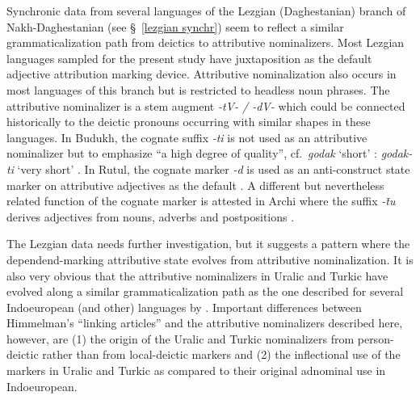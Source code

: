 {Synchronic data from several languages of the Lezgian (Daghestanian) branch of Nakh-Daghestanian (see \S~\ref{lezgian synchr}) seem to reflect a similar grammaticalization path from deictics to attributive nominalizers. Most Lezgian languages sampled for the present study have juxtaposition as the default adjective attribution marking device. Attributive nominalization also occurs in most languages of this branch but is restricted to headless noun phrases. The attributive nominalizer is a stem augment \textit{-tV- / -dV-} which could be connected historically to the deictic pronouns occurring with similar shapes in these languages. In Budukh, the cognate suffix \textit{-ti} is not used as an attributive nominalizer but to emphasize “a high degree of quality”, cf.~\textit{godak} ‘short’ : \textit{godak-ti} ‘very short’ \citep[267]{alekseev1994b}. In Rutul, the cognate marker \textit{-d} is used as an anti-construct state marker on attributive adjectives as the default \citep[224]{alekseev1994a}. A different but nevertheless related function of the cognate marker is attested in Archi where the suffix \textit{-t̄u} derives adjectives from nouns, adverbs and postpositions \citep[318]{kibrik1994b}.

The Lezgian data needs further investigation, but it suggests a pattern where the dependend-marking attributive state evolves from attributive nominalization. It is also very obvious that the attributive nominalizers in Uralic and Turkic have evolved along a similar grammaticalization path as the one described for several Indoeuropean (and other) languages by \cite{himmelmann1997}. Important differences between Himmelman's “linking articles” and the attributive nominalizers described here, however, are (1) the origin of the Uralic and Turkic nominalizers from person-deictic rather than from local-deictic markers and (2) the inflectional use of the markers in Uralic and Turkic as compared to their original adnominal use in Indoeuropean.

}
